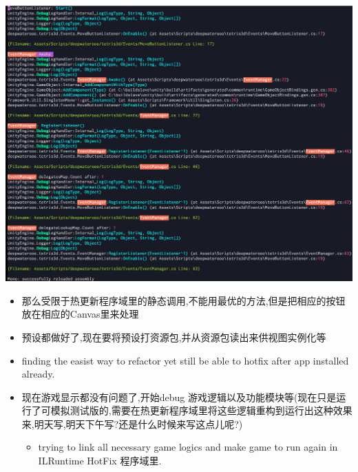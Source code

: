 \documentclass[9pt, b5paper]{article}
\begin{document}
\includegraphics[width=.9\linewidth]{./pic/readme_20221029_185957.png}
\begin{itemize}
\item 那么受限于热更新程序域里的静态调用,不能用最优的方法,但是把相应的按钮放在相应的Canvas里来处理
\item 预设都做好了,现在要将预设打资源包,并从资源包读出来供视图实例化等
\item finding the easist way to refactor yet still be able to hotfix after app installed already.
\item 现在游戏显示都没有问题了,开始debug 游戏逻辑以及功能模块等(现在只是运行了可模拟测试版的,需要在热更新程序域里将这些逻辑重构到运行出这种效果来,明天写,明天下午写?还是什么时候来写这点儿呢?)
\begin{itemize}
\item trying to link all necessary game logics and make game to run again in ILRuntime HotFix 程序域里.
\end{itemize}
\end{itemize}
\end{document}

